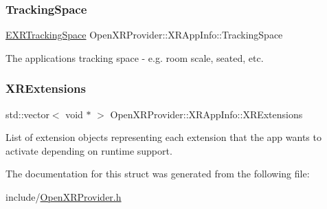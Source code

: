 \mbox{\label{struct_open_x_r_provider_1_1_x_r_app_info_adc373e7d26617bc10d2d46d6152a6a17}} 
\subsubsection{\texorpdfstring{TrackingSpace}{TrackingSpace}}
{\footnotesize\ttfamily \mbox{\hyperlink{namespace_open_x_r_provider_a005dd91723b05b123b8fccbc41798b05}{E\+X\+R\+Tracking\+Space}} Open\+X\+R\+Provider\+::\+X\+R\+App\+Info\+::\+Tracking\+Space}



The application\textquotesingle{}s tracking space -\/ e.\+g. room scale, seated, etc. 

\mbox{\label{struct_open_x_r_provider_1_1_x_r_app_info_a8b51fa00d11c4b3711440bf4b20b57fe}} 
\subsubsection{\texorpdfstring{XRExtensions}{XRExtensions}}
{\footnotesize\ttfamily std\+::vector$<$ void $\ast$ $>$ Open\+X\+R\+Provider\+::\+X\+R\+App\+Info\+::\+X\+R\+Extensions}



List of extension objects representing each extension that the app wants to activate depending on runtime support. 



The documentation for this struct was generated from the following file\+:\begin{DoxyCompactItemize}
\item 
include/\mbox{\hyperlink{_open_x_r_provider_8h}{Open\+X\+R\+Provider.\+h}}\end{DoxyCompactItemize}
